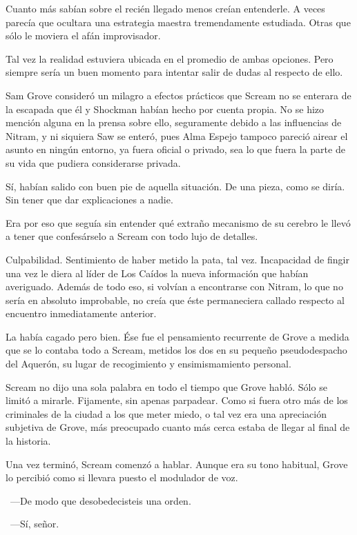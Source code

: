 Cuanto más sabían sobre el recién llegado menos creían entenderle. A veces parecía que ocultara una estrategia maestra tremendamente estudiada. Otras que sólo le moviera el afán improvisador.

Tal vez la realidad estuviera ubicada en el promedio de ambas opciones. Pero siempre sería un buen momento para intentar salir de dudas al respecto de ello.

\fancyparbreak
Sam Grove consideró un milagro a efectos prácticos que Scream no se enterara de la escapada que él y Shockman habían hecho por cuenta propia. No se hizo mención alguna en la prensa sobre ello, seguramente debido a las influencias de Nitram, y ni siquiera Saw se enteró, pues Alma Espejo tampoco pareció airear el asunto en ningún entorno, ya fuera oficial o privado, sea lo que fuera la parte de su vida que pudiera considerarse privada.

Sí, habían salido con buen pie de aquella situación. De una pieza, como se diría. Sin tener que dar explicaciones a nadie.

Era por eso que seguía sin entender qué extraño mecanismo de su cerebro le llevó a tener que confesárselo a Scream con todo lujo de detalles.

Culpabilidad. Sentimiento de haber metido la pata, tal vez. Incapacidad de fingir una vez le diera al líder de Los Caídos la nueva información que habían averiguado. Además de todo eso, si volvían a encontrarse con Nitram, lo que no sería en absoluto improbable, no creía que éste permaneciera callado respecto al encuentro inmediatamente anterior.

La había cagado pero bien. Ése fue el pensamiento recurrente de Grove a medida que se lo contaba todo a Scream, metidos los dos en su pequeño pseudodespacho del Aquerón, su lugar de recogimiento y ensimismamiento personal.

Scream no dijo una sola palabra en todo el tiempo que Grove habló. Sólo se limitó a mirarle. Fijamente, sin apenas parpadear. Como si fuera otro más de los criminales de la ciudad a los que meter miedo, o tal vez era una apreciación subjetiva de Grove, más preocupado cuanto más cerca estaba de llegar al final de la historia.

Una vez terminó, Scream comenzó a hablar. Aunque era su tono habitual, Grove lo percibió como si llevara puesto el modulador de voz.

~---De modo que desobedecisteis una orden.

~---Sí, señor.

